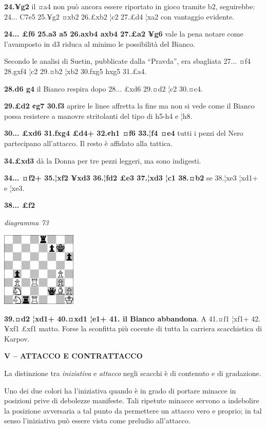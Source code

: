 \documentclass[
]{article}
\begin{document}
\textbf{24.¥g2} il ¤a4 non può ancora essere riportato in gioco tramite
b2, seguirebbe: 24... C7e5 25.¥g2 ¤xb2 26.£xb2 ¦c2 27.£d4 ¦xa2 con
vantaggio evidente.

\textbf{24... £f6 25.a3 a5 26.axb4 axb4 27.£a2 ¥g6} vale la pena notare
come l'avamposto in d3 riduca al minimo le possibilità del Bianco.

Secondo le analisi di Suetin, pubblicate dalla ``Pravda'', era sbagliata
27... ¤f4 28.gxf4 ¦c2 29.¤b2 ¦xb2 30.fxg5 hxg5 31.£a4.

\textbf{28.d6 g4} il Bianco respira dopo 28... £xd6 29.¤d2 ¦c2 30.¤c4.

\textbf{29.£d2 ¢g7 30.f3} aprire le linee affretta la fine ma non si
vede come il Bianco possa resistere a manovre stritolanti del tipo di
h5-h4 e ¦h8.

\textbf{30... £xd6 31.fxg4 £d4+ 32.¢h1 ¤f6 33.¦f4 ¤e4} tutti i pezzi del
Nero partecipano all'attacco. Il resto è affidato alla tattica.

\textbf{34.£xd3} dà la Donna per tre pezzi leggeri, ma sono indigesti.

\textbf{34... ¤f2+ 35.¦xf2 ¥xd3 36.¦fd2 £e3 37.¦xd3 ¦c1 38.¤b2} se
38.¦xe3 ¦xd1+ e ¦xe3.

\textbf{38... £f2}

\emph{diagramma 73}

\includegraphics[width=1.40139in,height=1.40139in]{vertopal_109f12be458a423d8f3cc838880eaea2/media/image73.png}

\textbf{39.¤d2 ¦xd1+ 40.¤xd1 ¦e1+ 41. il Bianco abbandona}. A 41.¤f1
¦xf1+ 42.¥xf1 £xf1 matto. Forse la sconfitta più cocente di tutta la
carriera scacchistica di Karpov.

\textbf{V -- ATTACCO E CONTRATTACCO}

La distinzione tra \emph{iniziativa} e \emph{attacco} negli scacchi è di
contenuto e di gradazione.

Uno dei due colori ha l'iniziativa quando è in grado di portare minacce
in posizioni prive di debolezze manifeste. Tali ripetute minacce servono
a indebolire la posizione avversaria a tal punto da permettere un
attacco vero e proprio; in tal senso l'iniziativa può essere vista come
preludio all'attacco.
\end{document}
